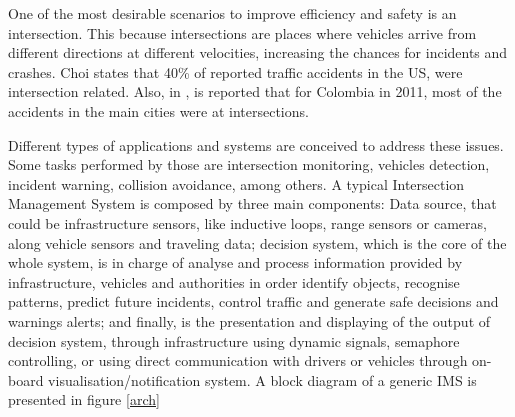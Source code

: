 One of the most desirable scenarios to improve efficiency and safety is an intersection. This because intersections are places where vehicles arrive from different directions at different velocities, increasing the chances for incidents and crashes. Choi \cite{Choi2010} states that 40\% of reported traffic accidents in the US, were intersection related. Also, in  \cite{CorporacionFondodePrevencionVial2010}, is reported that for Colombia in 2011, most of the accidents in the main cities were at intersections.

%


Different types of applications and systems are conceived to address these issues. Some tasks performed by those are intersection monitoring, vehicles detection, incident warning, collision avoidance, among others. A typical Intersection Management System is composed by three main components: Data source, that could be infrastructure sensors, like inductive loops, range sensors or cameras, along vehicle sensors and traveling data; decision system, which is the core of the whole system, is in charge of analyse and process information provided by infrastructure, vehicles and authorities in order identify objects, recognise patterns, predict future incidents, control traffic and generate safe decisions and warnings alerts; and finally, is the presentation and displaying of the output of decision system, through infrastructure using dynamic signals, semaphore controlling, or using direct communication with drivers or vehicles through on-board visualisation/notification system. A block diagram of a generic IMS is presented in figure \ref{arch}

